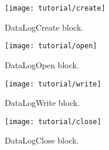 




\begin{figure}[H] \centering
\begin{minipage}{.45\textwidth}
  \centering
 \texttt{[image: tutorial/create]}
  \caption{DataLogCreate block.}
  \label{fig:datalogcreate}
\end{minipage}
% 
\begin{minipage}{.45\textwidth}
  \centering
 \texttt{[image: tutorial/open]}
\caption{DataLogOpen block.}
  \label{fig:datalogopen}
\end{minipage}
\end{figure}

\begin{figure}[H] \centering
\begin{minipage}{.45\textwidth}
  \centering
	\texttt{[image: tutorial/write]}
	\caption{DataLogWrite block.}
	\label{fig:datalogwrite}
\end{minipage}
% 
\begin{minipage}{.45\textwidth}
  \centering
 \texttt{[image: tutorial/close]}
  \caption{DataLogClose block.}
  \label{fig:datalogclose}
\end{minipage}
\end{figure}



